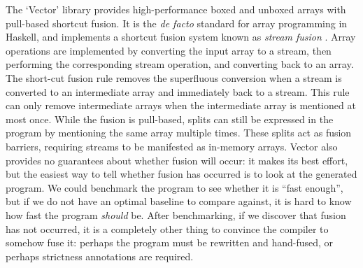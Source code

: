 The `Vector' library provides high-performance boxed and unboxed arrays with pull-based shortcut fusion.
It is the \emph{de facto} standard for array programming in Haskell, and implements a shortcut fusion system known as \emph{stream fusion} \citep{coutts2007stream}.
Array operations are implemented by converting the input array to a stream, then performing the corresponding stream operation, and converting back to an array.
The short-cut fusion rule removes the superfluous conversion when a stream is converted to an intermediate array and immediately back to a stream.
This rule can only remove intermediate arrays when the intermediate array is mentioned at most once.
While the fusion is pull-based, splits can still be expressed in the program by mentioning the same array multiple times.
These splits act as fusion barriers, requiring streams to be manifested as in-memory arrays.
Vector also provides no guarantees about whether fusion will occur: it makes its best effort, but the easiest way to tell whether fusion has occurred is to look at the generated program.
We could benchmark the program to see whether it is ``fast enough'', but if we do not have an optimal baseline to compare against, it is hard to know how fast the program \emph{should} be.
After benchmarking, if we discover that fusion has not occurred, it is a completely other thing to convince the compiler to somehow fuse it: perhaps the program must be rewritten and hand-fused, or perhaps strictness annotations are required.




